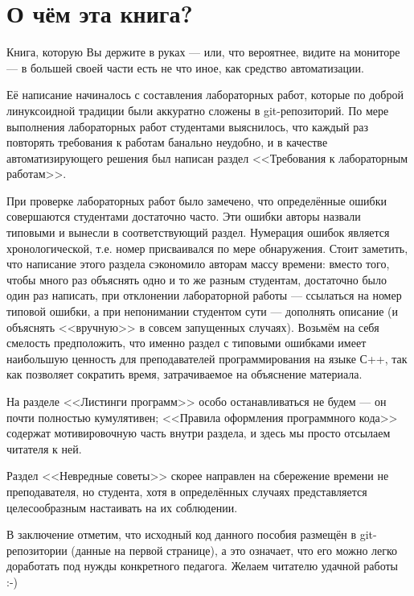 \chapter*{О чём эта книга?}

Книга, которую Вы держите в руках ---
или, что вероятнее, видите на мониторе ---
в большей своей части есть не что иное, как средство автоматизации.

Её написание начиналось с составления лабораторных работ,
которые по доброй линуксоидной традиции были аккуратно сложены в git-репозиторий.
По мере выполнения лабораторных работ студентами выяснилось,
что каждый раз повторять требования к работам банально неудобно,
и в качестве автоматизирующего решения был написан раздел <<Требования к лабораторным работам>>.

При проверке лабораторных работ было замечено, что определённые ошибки совершаются студентами достаточно часто.
Эти ошибки авторы назвали типовыми и вынесли в соответствующий раздел.
Нумерация ошибок является хронологической, т.е. номер присваивался по мере обнаружения.
Стоит заметить, что написание этого раздела сэкономило авторам массу времени:
вместо того, чтобы много раз объяснять одно и то же разным студентам,
достаточно было один раз написать, при отклонении лабораторной работы
--- ссылаться на номер типовой ошибки, а при непонимании студентом сути ---
дополнять описание (и объяснять <<вручную>> в совсем запущенных случаях).
Возьмём на себя смелость предположить,
что именно раздел с типовыми ошибками имеет наибольшую ценность для преподавателей программирования на языке С++,
так как позволяет сократить время, затрачиваемое на объяснение материала.

На разделе <<Листинги программ>> особо останавливаться не будем ---
он почти полностью кумулятивен;
<<Правила оформления программного кода>> содержат мотивировочную часть внутри раздела,
и здесь мы просто отсылаем читателя к ней.

Раздел <<Невредные советы>> скорее направлен на сбережение времени не преподавателя, но студента,
хотя в определённых случаях представляется целесообразным настаивать на их соблюдении.

В заключение отметим, что исходный код данного пособия размещён в git-репозитории (данные на первой странице),
а это означает, что его можно легко доработать под нужды конкретного педагога. Желаем читателю удачной работы :-)




